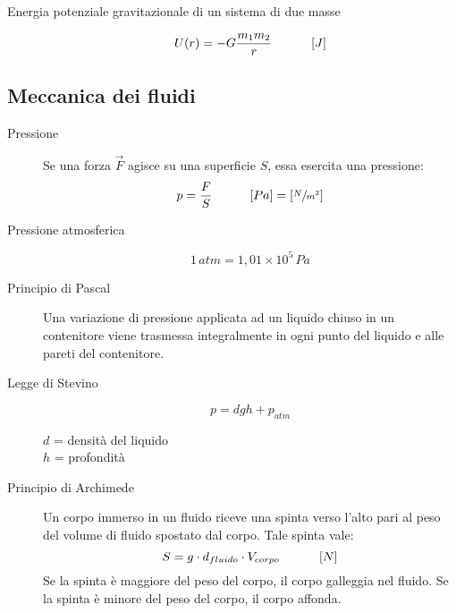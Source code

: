 \documentclass[a4paper,11pt,italian]{article}
\begin{document}
\begin{description}
  \item[Energia potenziale gravitazionale di un sistema di due masse] 
  \[ U(r) = - G \frac{m_1m_2}{r} \hspace*{3em} \left[ J \right] \]
\end{description}


\subsection{Meccanica dei fluidi}

\begin{description}
  \item[Pressione] 
  Se una forza $ \vec{F} $ agisce su una superficie $ S $, essa esercita una pressione:
  \[ p = \frac{F}{S} \hspace*{3em} [Pa] = \left[ \sfrac{N}{m^2} \right] \]
  
  \item[Pressione atmosferica]
  \[ 1 \, atm = 1,01 \times 10^5 \, Pa \]
  
  \item[Principio di Pascal] 
  Una variazione di pressione applicata ad un liquido chiuso in un contenitore viene trasmessa integralmente in ogni punto del liquido e alle pareti del contenitore.
  
  \item[Legge di Stevino]
  \[ p = dgh + p_{atm} \]
  \begin{multicols}{2}
  $ d $ = densità del liquido\\
  $ h $ = profondità
  \end{multicols}
  
  \item[Principio di Archimede] 
  Un corpo immerso in un fluido riceve una spinta verso l'alto pari al peso del volume di fluido spostato dal corpo. Tale spinta vale:
  \[ S = g \cdot d_{fluido} \cdot V_{corpo} \hspace*{3em} \left[ N \right] \]
  Se la spinta è maggiore del peso del corpo, il corpo galleggia nel fluido. Se la spinta è minore del peso del corpo, il corpo affonda.
  
%   


\end{description}
\end{document}
